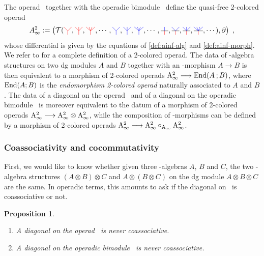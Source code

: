\documentclass[twoside, 12pt]{amsart}
\newtheorem{proposition}[definition]{Proposition}
\theoremstyle{remark}
\begin{document}
The operad \Ainf\ together with the operadic bimodule \Minf\ define the quasi-free 2-colored operad 
\[ A_\infty^2 := \left( \mathcal{T} (\arbreopdeuxcol{red} , \arbreoptroiscol{red} , \arbreopquatrecol{red}, \cdots, \arbreopdeuxcol{blue} , \arbreoptroiscol{blue} , \arbreopquatrecol{blue} , \cdots, \arbreopunmorph , \arbreopdeuxmorph , \arbreoptroismorph , \arbreopquatremorph , \cdots )  , \partial \right) \ , \]
whose differential is given by the equations of \cref{def:ainf-alg} and \cref{def:ainf-morph}.
We refer to \cite[Section 11]{yau-colored} for a complete definition of a 2-colored operad.
The data of \Ainf -algebra structures on two dg modules $A$ and $B$ together with an \Ainf -morphism $A \rightarrow B$ is then equivalent to a morphism of 2-colored operads $\mathrm{A}_\infty^2 \longrightarrow \mathrm{End} ( A \text{\hspace{2pt}} ; B) $, where $\mathrm{End} ( A ; B)$ is the \textit{endomorphism 2-colored operad} naturally associated to $A$ and $B$.
The data of a diagonal on the operad \Ainf\ and of a diagonal on the operadic bimodule \Minf\ is moreover equivalent to the datum of a morphism of 2-colored operads $\mathrm{A}_\infty^2 \longrightarrow \mathrm{A}_\infty^2 \otimes \mathrm{A}_\infty^2$, while the composition of \Ainf -morphisms can be defined by a morphism of 2-colored operads $\mathrm{A}_\infty^2 \longrightarrow \mathrm{A}_\infty^2 \circ_{\mathrm{A}_\infty} \mathrm{A}_\infty^2 $.


\subsubsection{Coassociativity and cocommutativity} \label{sss:coassoc-cocomm}

First, we would like to know whether given three \Ainf -algebras $A$, $B$ and $C$, the two \Ainf -algebra structures $( A \otimes B) \otimes C$ and $A \otimes ( B \otimes C)$ on the dg module $A \otimes B \otimes C$ are the same. 
In operadic terms, this amounts to ask if the diagonal on \Ainf\ is coassociative or not.

\begin{proposition} \label{prop:pas-coassoc}
  \label{prop:nocoassoc}
  \begin{enumerate}[leftmargin=*,label=(\roman*)]
  \item A diagonal on the operad \Ainf\ is never coassociative. 
  \item A diagonal on the operadic bimodule \Minf\ is never coassociative.
  \end{enumerate}
\end{proposition} 
\end{document}
